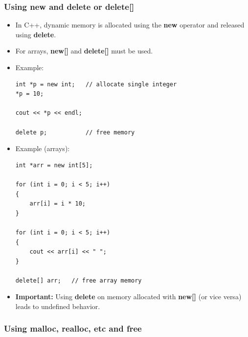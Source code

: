 \documentclass[10pt]{article}
\newcommand{\pbreak}{\vspace{30pt}}
\begin{document}
\pbreak

\subsubsection{Using new and delete or delete[]}

\begin{itemize}
	\item In C++, dynamic memory is allocated using the \textbf{new} operator and released using \textbf{delete}.
	\item For arrays, \textbf{new[]} and \textbf{delete[]} must be used.

	\item Example:
	\begin{verbatim}
int *p = new int;   // allocate single integer
*p = 10;

cout << *p << endl;

delete p;           // free memory
	\end{verbatim}

	\item Example (arrays):
	\begin{verbatim}
int *arr = new int[5];

for (int i = 0; i < 5; i++)
{
    arr[i] = i * 10;
}

for (int i = 0; i < 5; i++)
{
    cout << arr[i] << " ";
}

delete[] arr;   // free array memory
	\end{verbatim}

	\item \textbf{Important:} Using \textbf{delete} on memory allocated with \textbf{new[]} (or vice versa) leads to undefined behavior.
\end{itemize}

\newpage
\subsubsection{Using malloc, realloc, etc and free}
\end{document}
